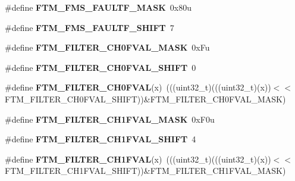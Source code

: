 \begin{DoxyCompactItemize}
\item 
\#define {\bfseries F\+T\+M\+\_\+\+F\+M\+S\+\_\+\+F\+A\+U\+L\+T\+F\+\_\+\+M\+A\+SK}~0x80u\hypertarget{group__FTM__Register__Masks_ga93fbf9b3017167d24d1f0c067bccb539}{}\label{group__FTM__Register__Masks_ga93fbf9b3017167d24d1f0c067bccb539}

\item 
\#define {\bfseries F\+T\+M\+\_\+\+F\+M\+S\+\_\+\+F\+A\+U\+L\+T\+F\+\_\+\+S\+H\+I\+FT}~7\hypertarget{group__FTM__Register__Masks_ga05ba4258421f814e99f498159df781d7}{}\label{group__FTM__Register__Masks_ga05ba4258421f814e99f498159df781d7}

\item 
\#define {\bfseries F\+T\+M\+\_\+\+F\+I\+L\+T\+E\+R\+\_\+\+C\+H0\+F\+V\+A\+L\+\_\+\+M\+A\+SK}~0x\+Fu\hypertarget{group__FTM__Register__Masks_ga021b2ed3cc7b79cda874ff49fbd0dd5a}{}\label{group__FTM__Register__Masks_ga021b2ed3cc7b79cda874ff49fbd0dd5a}

\item 
\#define {\bfseries F\+T\+M\+\_\+\+F\+I\+L\+T\+E\+R\+\_\+\+C\+H0\+F\+V\+A\+L\+\_\+\+S\+H\+I\+FT}~0\hypertarget{group__FTM__Register__Masks_ga35f6890f59003ec058dbcc151ebc399c}{}\label{group__FTM__Register__Masks_ga35f6890f59003ec058dbcc151ebc399c}

\item 
\#define {\bfseries F\+T\+M\+\_\+\+F\+I\+L\+T\+E\+R\+\_\+\+C\+H0\+F\+V\+AL}(x)~(((uint32\+\_\+t)(((uint32\+\_\+t)(x))$<$$<$F\+T\+M\+\_\+\+F\+I\+L\+T\+E\+R\+\_\+\+C\+H0\+F\+V\+A\+L\+\_\+\+S\+H\+I\+FT))\&F\+T\+M\+\_\+\+F\+I\+L\+T\+E\+R\+\_\+\+C\+H0\+F\+V\+A\+L\+\_\+\+M\+A\+SK)\hypertarget{group__FTM__Register__Masks_ga8ca64d4437bf63561c5222244e8a696a}{}\label{group__FTM__Register__Masks_ga8ca64d4437bf63561c5222244e8a696a}

\item 
\#define {\bfseries F\+T\+M\+\_\+\+F\+I\+L\+T\+E\+R\+\_\+\+C\+H1\+F\+V\+A\+L\+\_\+\+M\+A\+SK}~0x\+F0u\hypertarget{group__FTM__Register__Masks_gae3c17178123eda4dedc1b20f4c6d331e}{}\label{group__FTM__Register__Masks_gae3c17178123eda4dedc1b20f4c6d331e}

\item 
\#define {\bfseries F\+T\+M\+\_\+\+F\+I\+L\+T\+E\+R\+\_\+\+C\+H1\+F\+V\+A\+L\+\_\+\+S\+H\+I\+FT}~4\hypertarget{group__FTM__Register__Masks_gaed23e149091b6f6982050e2de4385584}{}\label{group__FTM__Register__Masks_gaed23e149091b6f6982050e2de4385584}

\item 
\#define {\bfseries F\+T\+M\+\_\+\+F\+I\+L\+T\+E\+R\+\_\+\+C\+H1\+F\+V\+AL}(x)~(((uint32\+\_\+t)(((uint32\+\_\+t)(x))$<$$<$F\+T\+M\+\_\+\+F\+I\+L\+T\+E\+R\+\_\+\+C\+H1\+F\+V\+A\+L\+\_\+\+S\+H\+I\+FT))\&F\+T\+M\+\_\+\+F\+I\+L\+T\+E\+R\+\_\+\+C\+H1\+F\+V\+A\+L\+\_\+\+M\+A\+SK)\hypertarget{group__FTM__Register__Masks_ga3face5c96a8f83237f9e95786fc4a014}{}\label{group__FTM__Register__Masks_ga3face5c96a8f83237f9e95786fc4a014}


\end{DoxyCompactItemize}
